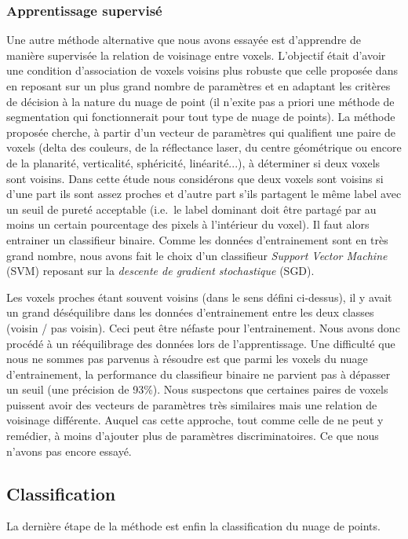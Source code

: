 \documentclass[a4paper, onecolumn, 11pt]{article}
\begin{document}
\subsubsection{Apprentissage supervisé}
Une autre méthode alternative que nous avons essayée est d'apprendre de manière supervisée la relation de voisinage entre voxels. L'objectif était d'avoir une condition d'association de voxels voisins plus robuste que celle proposée dans \cite{aka_article} en reposant sur un plus grand nombre de paramètres et en adaptant les critères de décision à la nature du nuage de point (il n'exite pas a priori une méthode de segmentation qui fonctionnerait pour tout type de nuage de points). La méthode proposée cherche, à partir d'un vecteur de paramètres qui qualifient une paire de voxels (delta des couleurs, de la réflectance laser, du centre géométrique ou encore de la planarité, verticalité, sphéricité, linéarité...), à déterminer si deux voxels sont voisins. Dans cette étude nous considérons que deux voxels sont voisins si d'une part ils sont assez proches et d'autre part s'ils partagent le même label avec un seuil de pureté acceptable (i.e.\ le label dominant doit être partagé par au moins un certain pourcentage des pixels à l'intérieur du voxel). Il faut alors entrainer un classifieur binaire. Comme les données d'entrainement sont en très grand nombre, nous avons fait le choix d'un classifieur \emph{Support Vector Machine} (SVM)  reposant sur la \emph{descente de gradient stochastique} (SGD).

Les voxels proches étant souvent voisins (dans le sens défini ci-dessus), il y avait un grand déséquilibre dans les données d'entrainement entre les deux classes (voisin / pas voisin). Ceci peut être néfaste pour l'entrainement. Nous avons donc procédé à un rééquilibrage des données lors de l'apprentissage. Une difficulté que nous ne sommes pas parvenus à résoudre est que parmi les voxels du nuage d'entrainement, la performance du classifieur binaire ne parvient pas à dépasser un seuil (une précision de 93\%). Nous suspectons que certaines paires de voxels puissent avoir des vecteurs de paramètres très similaires mais une relation de voisinage différente. Auquel cas cette approche, tout comme celle de \cite{aka_article} ne peut y remédier, à moins d'ajouter plus de paramètres discriminatoires. Ce que nous n'avons pas encore essayé.

\subsection{Classification}
La dernière étape de la méthode est enfin la classification du nuage de points.
\end{document}
